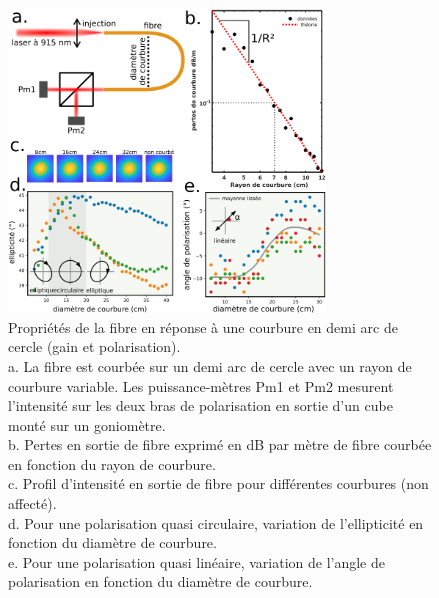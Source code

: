 \begin{figure}[hb!]
    \centering
    \includegraphics[width=0.75\textwidth]{./files/fiber_bending.svg.png}
    \caption{Propriétés de la fibre en réponse à une courbure en demi arc de cercle (gain et polarisation).
    \\ a. La fibre est courbée sur un demi arc de cercle avec un rayon de courbure variable. Les puissance-mètres Pm1 et Pm2 mesurent l'intensité sur les deux bras de polarisation en sortie d'un cube monté sur un goniomètre. 
    \\ b. Pertes en sortie de fibre exprimé en dB par mètre de fibre courbée en fonction du rayon de courbure.
    \\ c. Profil d'intensité en sortie de fibre pour différentes courbures (non affecté).
    \\ d. Pour une polarisation quasi circulaire, variation de l'ellipticité en fonction du diamètre de courbure.
    \\ e. Pour une polarisation quasi linéaire, variation de l'angle de polarisation en fonction du diamètre de courbure.
    \label{FIGfibercarac}}
    \end{figure}



